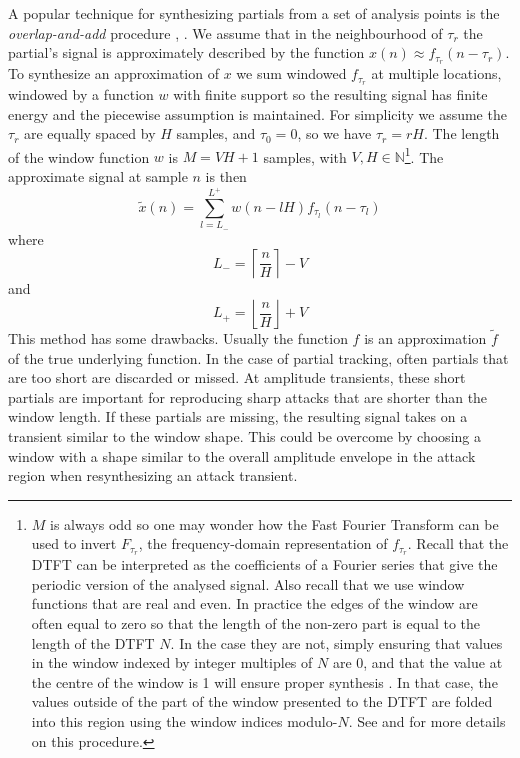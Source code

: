 A popular technique for synthesizing partials from a set of analysis points is
the \textit{overlap-and-add} procedure \cite{portnoff1976implementation},
\cite{moore1990elements}. We assume that in the neighbourhood of $\tau_{r}$ the
partial's signal is approximately described by the function $x(n) \approx
f_{\tau_{r}}(n-\tau_{r})$. To synthesize an approximation of $x$ we sum windowed
$f_{\tau_{r}}$ at multiple locations, windowed by a function $w$ with finite
support so the resulting signal has finite energy and the piecewise assumption
is maintained. For simplicity we assume the $\tau_{r}$ are equally spaced by $H$
samples, and $\tau_{0}=0$, so we have $\tau_{r} = rH$. The length of the window
function $w$ is $M = VH + 1$ samples, with $V,H \in \mathbb{N}%
$\footnote{%
    $M$ is always odd so one may wonder how the Fast Fourier Transform can be
    used to invert $F_{\tau_{r}}$, the frequency-domain representation of
    $f_{\tau_{r}}$.  Recall that the DTFT can be interpreted as the coefficients
    of a Fourier series that give the periodic version of the analysed signal.
    Also recall that we use window functions that are real and even. In practice
    the edges of the window are often equal to zero so that the length of the
    non-zero part is equal to the length of the DTFT $N$. In the case they are
    not, simply ensuring that values in the window indexed by integer multiples
    of $N$ are 0, and that the value at the centre of the window is 1 will ensure proper
    synthesis \cite[p.~244]{portnoff1976implementation}. In that case, the values
    outside of the part of the window presented to the DTFT are folded into this
    region using the window indices modulo-$N$. See
    \cite{portnoff1976implementation} and \cite{moore1990elements} for more details on this
    procedure.%
}.
The approximate signal at sample $n$ is then
\[
    \tilde{x}(n) = \sum_{l=L_{-}}^{L^{+}} w(n-lH) f_{\tau_l}(n-\tau_l)
\]
where
\[
    L_{-} = \left\lceil \frac{n}{H} \right\rceil - V
\]
and
\[
    L_{+} = \left\lfloor \frac{n}{H} \right\rfloor + V
\]
This method has some drawbacks. Usually the function $f$ is an approximation
$\tilde{f}$ of the true underlying function. In the case of partial tracking,
often partials that are too short are discarded or missed. At amplitude
transients, these short partials are important for reproducing sharp attacks
that are shorter than the window length. If these partials are missing, the
resulting signal takes on a transient similar to the window shape. This could be
overcome by choosing a window with a shape similar to the overall amplitude
envelope in the attack region when resynthesizing an attack transient.

